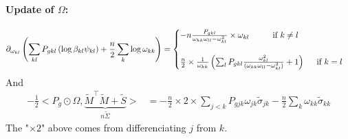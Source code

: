 \documentclass[11pt,a4paper]{article}
\begin{document}
\paragraph{Update of $\Omega$:}

\[
 \partial_{\omega_{kl}}\left(\sum_{kl} P_{gkl} \left(\log  \beta_{kl}\psi_{kl}\right) +\frac{n}{2} \sum_k \log \omega_{kk}\right) =\begin{cases}
               -n \frac{P_{gkl} }{\omega_{kk}\omega_{ll}-\omega_{kl}^2}\times \omega_{kl} \text{\hspace{1cm}if $k\neq l$}\\\\
              \frac{n}{2} \times\frac{1}{\omega_{kk}} \left(\sum_l P_{gkl} \frac{\omega_{kl}^2}{(\omega_{kk}\omega_{ll}-\omega_{kl}^2)} + 1\right)\text{\hspace{0.5cm}if $k = l$}
            \end{cases}
\]
And
\begin{align*}
- \frac{1}{2} <P_g \odot \Omega, \underbrace{\widetilde{M}^\intercal \widetilde{M} + \widetilde{S}}_{n\widetilde{\Sigma}}> &=- \frac{n}{2}\times 2 \times \sum_{j<k}P_{gjk} \omega_{jk} \widetilde{\sigma}_{jk}- \frac{n}{2}\sum_{ k} \omega_{kk} \widetilde{\sigma}_{kk}
\end{align*}
The "$\times 2$" above comes from differenciating $j$ from $k$.
\end{document}
